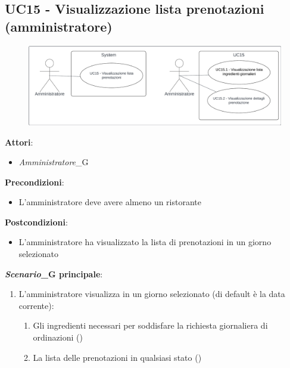 \subsection{UC15 - Visualizzazione lista prenotazioni (amministratore)} \label{usecase:15}
\begin{figure}[H]
    \centering
    \includegraphics[width=0.9\linewidth]{ucd/ucd15.png}
\end{figure}
\textbf{Attori}:
\begin{itemize}
    \item \textit{Amministratore}_G
\end{itemize}
\textbf{Precondizioni}:
\begin{itemize}
    \item L'amministratore deve avere almeno un ristorante
\end{itemize}
\textbf{Postcondizioni}:
\begin{itemize}
    \item L'amministratore ha visualizzato la lista di prenotazioni in un giorno selezionato
\end{itemize}
\textbf{\textit{Scenario}_G principale}:
\begin{enumerate}
   \item L'amministratore visualizza in un giorno selezionato (di default è la data corrente):
   \begin{enumerate}
       \item Gli ingredienti necessari per soddisfare la richiesta giornaliera di ordinazioni ()
       \item La lista delle prenotazioni in qualsiasi stato
       ()
   \end{enumerate}
\end{enumerate}


